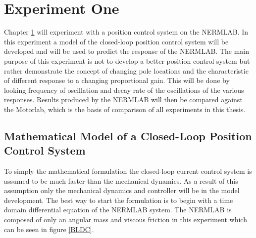 
\cleardoublepage

\chapter{Experiment One}
\label{chp4}

Chapter \ref{chp4} will experiment with a position control system on the NERMLAB. In this experiment a model of the closed-loop position control system will be developed and will be used to predict the response of the NERMLAB. The main purpose of this experiment is not to develop a better position control system but rather demonstrate the concept of changing pole locations and the characteristic of different response to a changing proportional gain. This will be done by looking frequency of oscillation and decay rate of the oscillations of the various responses. Results produced by the NERMLAB will then be compared against the Motorlab, which is the basis of comparison of all experiments in this thesis. 

\section{Mathematical Model of a Closed-Loop Position Control System}

To simply the mathematical formulation the closed-loop current control system is assumed to be much faster than the mechanical dynamics. As a result of this assumption only the mechanical dynamics and controller will be in the model development.  The best way to start the formulation is to begin with a time domain differential equation of the NERMLAB system. The NERMLAB is composed of only an angular mass and viscous friction in this experiment which can be seen in figure \ref{BLDC}.


